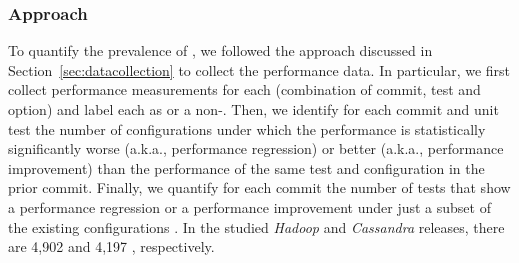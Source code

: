  
\subsubsection*{Approach}
To quantify the prevalence of \inconsistent, we followed the approach discussed in Section~\ref{sec:datacollection} to collect the performance data. In particular, we first collect performance measurements for each \textbf{\instance} (combination of commit, test and option) and label each \instance as \inconsistent or a non-\inconsistent. %
Then, we identify for each commit and unit test the number of configurations under which the performance is statistically significantly worse (a.k.a., performance regression) or better (a.k.a., performance improvement) than the performance of the same test and configuration in the prior commit. Finally, we quantify for each commit the number of tests that show a performance regression or a performance improvement under just a subset of the existing configurations . 
In the studied \emph{Hadoop} and \emph{Cassandra} releases, there are 4,902 and 4,197 \instance, respectively. 





